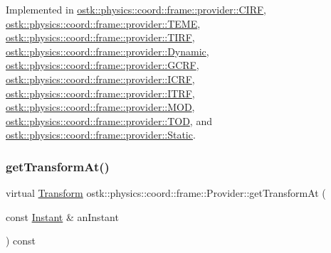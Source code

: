 Implemented in \hyperlink{classostk_1_1physics_1_1coord_1_1frame_1_1provider_1_1_c_i_r_f_a9c7c1e79785b676501e6a4686389a425}{ostk\+::physics\+::coord\+::frame\+::provider\+::\+C\+I\+RF}, \hyperlink{classostk_1_1physics_1_1coord_1_1frame_1_1provider_1_1_t_e_m_e_a10031d843340adafe7d9f4a3a0a4f86c}{ostk\+::physics\+::coord\+::frame\+::provider\+::\+T\+E\+ME}, \hyperlink{classostk_1_1physics_1_1coord_1_1frame_1_1provider_1_1_t_i_r_f_ae29e3db5bd1bccbc69a507f8716b73e5}{ostk\+::physics\+::coord\+::frame\+::provider\+::\+T\+I\+RF}, \hyperlink{classostk_1_1physics_1_1coord_1_1frame_1_1provider_1_1_dynamic_a37623142581671606ea45ca3bda0d0c8}{ostk\+::physics\+::coord\+::frame\+::provider\+::\+Dynamic}, \hyperlink{classostk_1_1physics_1_1coord_1_1frame_1_1provider_1_1_g_c_r_f_a71f14cba2d0d20a5bbeaa3b4fb08a79a}{ostk\+::physics\+::coord\+::frame\+::provider\+::\+G\+C\+RF}, \hyperlink{classostk_1_1physics_1_1coord_1_1frame_1_1provider_1_1_i_c_r_f_a40f7812d39719db68178ab6850a5cdde}{ostk\+::physics\+::coord\+::frame\+::provider\+::\+I\+C\+RF}, \hyperlink{classostk_1_1physics_1_1coord_1_1frame_1_1provider_1_1_i_t_r_f_aad7e29329b68f264bed571bf48b902a4}{ostk\+::physics\+::coord\+::frame\+::provider\+::\+I\+T\+RF}, \hyperlink{classostk_1_1physics_1_1coord_1_1frame_1_1provider_1_1_m_o_d_ac7d8c3c340359b0bf13728aa93d285e4}{ostk\+::physics\+::coord\+::frame\+::provider\+::\+M\+OD}, \hyperlink{classostk_1_1physics_1_1coord_1_1frame_1_1provider_1_1_t_o_d_ad374cdce01f5872311b61695502dd4e4}{ostk\+::physics\+::coord\+::frame\+::provider\+::\+T\+OD}, and \hyperlink{classostk_1_1physics_1_1coord_1_1frame_1_1provider_1_1_static_a3e25a6fc979fc4ac28d8cbea4835ea71}{ostk\+::physics\+::coord\+::frame\+::provider\+::\+Static}.

\mbox{\label{classostk_1_1physics_1_1coord_1_1frame_1_1_provider_a38b86a589f46f8b8a9c97ab2776f37d1}} 
\subsubsection{\texorpdfstring{get\+Transform\+At()}{getTransformAt()}}
{\footnotesize\ttfamily virtual \hyperlink{classostk_1_1physics_1_1coord_1_1_transform}{Transform} ostk\+::physics\+::coord\+::frame\+::\+Provider\+::get\+Transform\+At (\begin{DoxyParamCaption}\item[{const \hyperlink{classostk_1_1physics_1_1time_1_1_instant}{Instant} \&}]{an\+Instant }\end{DoxyParamCaption}) const\hspace{0.3cm}{\ttfamily [pure virtual]}}




